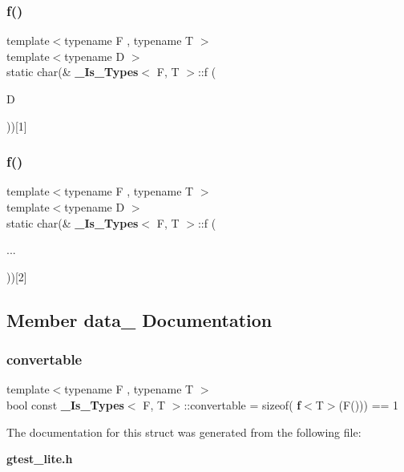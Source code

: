 \subsubsection{f()\hspace{0.1cm}{\footnotesize\ttfamily [1/2]}}
{\footnotesize\ttfamily template$<$typename F , typename T $>$ \\
template$<$typename D $>$ \\
static char(\& \textbf{ \+\_\+\+Is\+\_\+\+Types}$<$ F, T $>$\+::f (\begin{DoxyParamCaption}\item[{D}]{ }\end{DoxyParamCaption}))[1]\hspace{0.3cm}{\ttfamily [static]}}

\mbox{\label{struct___is___types_a013da65c5a92e9bd02f5d361c10d376d}} 
\subsubsection{f()\hspace{0.1cm}{\footnotesize\ttfamily [2/2]}}
{\footnotesize\ttfamily template$<$typename F , typename T $>$ \\
template$<$typename D $>$ \\
static char(\& \textbf{ \+\_\+\+Is\+\_\+\+Types}$<$ F, T $>$\+::f (\begin{DoxyParamCaption}\item[{}]{... }\end{DoxyParamCaption}))[2]\hspace{0.3cm}{\ttfamily [static]}}



\subsection{Member data_ Documentation}
\mbox{\label{struct___is___types_aef853f15f013611d0890cb6fc408ae47}} 
\subsubsection{convertable}
{\footnotesize\ttfamily template$<$typename F , typename T $>$ \\
bool const \textbf{ \+\_\+\+Is\+\_\+\+Types}$<$ F, T $>$\+::convertable = sizeof(\textbf{ f}$<$T$>$(F())) == 1\hspace{0.3cm}{\ttfamily [static]}}



The documentation for this struct was generated from the following file\+:\begin{DoxyCompactItemize}
\item 
\textbf{ gtest\+\_\+lite.\+h}\end{DoxyCompactItemize}
